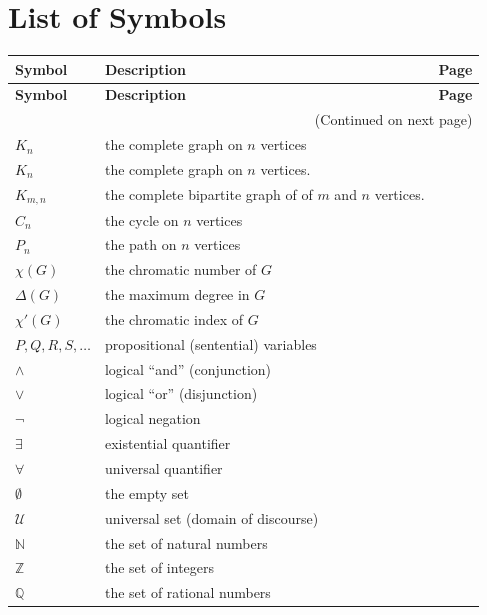 \documentclass[10pt,]{book}
\theoremstyle{plain}
\theoremstyle{definition}
\theoremstyle{definition}
\theoremstyle{definition}
\theoremstyle{definition}
\numberwithin{equation}{chapter}
\def\N{\mathbb N}
\def\Z{\mathbb Z}
\def\Q{\mathbb Q}
\def\U{\mathcal U}
\begin{document}
\chapter[{List of Symbols}]{List of Symbols}\label{appendix-4}
\begin{longtable}[l]{lp{}r}
\textbf{Symbol}&\textbf{Description}&\textbf{Page}\\[1em]
\endfirsthead
\textbf{Symbol}&\textbf{Description}&\textbf{Page}\\[1em]
\endhead
\multicolumn{3}{r}{(Continued on next page)}\\
\endfoot
\endlastfoot
\(K_n\)&the complete graph on \(n\) vertices&\pageref{notation-1}\\
\(K_n\)&the complete graph on \(n\) vertices.&\pageref{notation-2}\\
\(K_{m,n}\)&the complete bipartite graph of of \(m\) and \(n\) vertices.&\pageref{notation-3}\\
\(C_n\)&the cycle on \(n\) vertices&\pageref{notation-4}\\
\(P_n\)&the path on \(n\) vertices&\pageref{notation-5}\\
\(\chi(G)\)&the chromatic number of \(G\)&\pageref{notation-6}\\
\(\Delta(G)\)&the maximum degree in \(G\)&\pageref{notation-7}\\
\(\chi'(G)\)&the chromatic index of \(G\)&\pageref{notation-8}\\
\(P, Q, R, S, \ldots\)&propositional (sentential) variables&\pageref{notation-9}\\
\(\wedge\)&logical ``and'' (conjunction)&\pageref{notation-10}\\
\(\vee\)&logical ``or'' (disjunction)&\pageref{notation-11}\\
\(\neg\)&logical negation&\pageref{notation-12}\\
\(\exists\)&existential quantifier&\pageref{notation-13}\\
\(\forall\)&universal quantifier&\pageref{notation-14}\\
\(\emptyset\)&the empty set&\pageref{notation-15}\\
\(\U\)&universal set (domain of discourse)&\pageref{notation-16}\\
\(\N\)&the set of natural numbers&\pageref{notation-17}\\
\(\Z\)&the set of integers&\pageref{notation-18}\\
\(\Q\)&the set of rational numbers&\pageref{notation-19}\\

\end{longtable}
\end{document}
